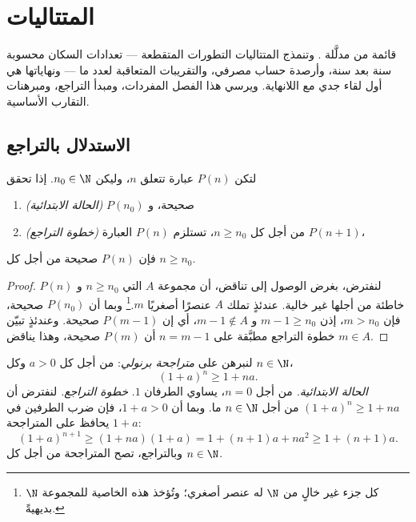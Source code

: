 \chapter{المتتاليات}\label{ch:g12:seq}

 قائمة من  مدلَّلة . وتنمذج المتتاليات
التطورات المتقطعة --- تعدادات السكان محسوبة سنة بعد سنة، وأرصدة
حساب مصرفي، والتقريبات المتعاقبة لعدد ما --- ونهاياتها هي
أول لقاء جدي مع اللانهاية. ويرسي هذا الفصل
المفردات، ومبدأ التراجع، ومبرهنات التقارب
الأساسية.

\section{الاستدلال بالتراجع}

\begin{theorem}\label{thm:g12:seq:induction}
لتكن $P(n)$ عبارة تتعلق  $n$، وليكن $n_0 \in \N$.
إذا تحقق
\begin{enumerate}
  \item \emph{(الحالة الابتدائية)} $P(n_0)$ صحيحة، و
  \item \emph{(خطوة التراجع)} من أجل كل $n \geq n_0$، تستلزم $P(n)$ العبارة $P(n+1)$،
\end{enumerate}
فإن $P(n)$ صحيحة من أجل كل $n \geq n_0$.
\end{theorem}

\begin{proof}
لنفترض، بغرض الوصول إلى تناقض، أن مجموعة  $A$ التي $n \geq n_0$ و
$P(n)$ خاطئة من أجلها غير خالية. عندئذٍ تملك $A$ عنصرًا أصغريًا
$m$.\footnote{كل جزء غير خالٍ من $\N$ له عنصر أصغري؛ وتُؤخذ هذه
الخاصية للمجموعة $\N$ بديهيةً.} وبما أن $P(n_0)$ صحيحة، فإن $m > n_0$، إذن
$m - 1 \geq n_0$ و $m-1 \notin A$، أي إن $P(m-1)$ صحيحة. وعندئذٍ تبيّن خطوة
التراجع مطبَّقة على $n = m-1$ أن $P(m)$ صحيحة، وهذا يناقض
$m \in A$.
\end{proof}

\begin{example}\label{ex:g12:seq:bernoulli}
لنبرهن على \emph{متراجحة برنولي}: من أجل كل  $a > 0$ وكل
$n \in \N$،
\[
(1+a)^n \geq 1 + na.
\]
\emph{الحالة الابتدائية.} من أجل $n = 0$، يساوي الطرفان $1$.
\emph{خطوة التراجع.} لنفترض أن $(1+a)^n \geq 1+na$ من أجل $n \in \N$ ما. وبما أن
$1 + a > 0$، فإن ضرب الطرفين في $1+a$ يحافظ على المتراجحة:
\[
(1+a)^{n+1} \geq (1+na)(1+a) = 1 + (n+1)a + na^2 \geq 1 + (n+1)a .
\]
وبالتراجع، تصح المتراجحة من أجل كل $n \in \N$.
\end{example}

